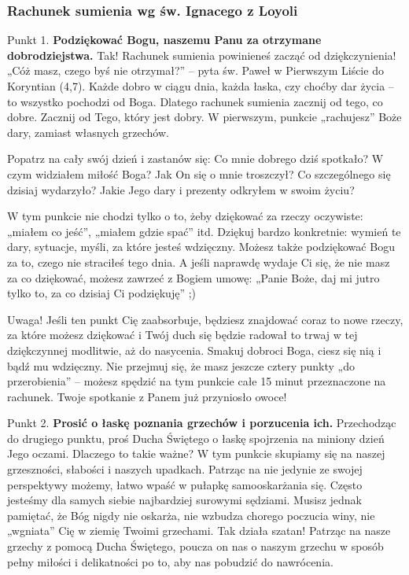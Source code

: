 \documentclass[twocolumn,fleqn,oneside,openany,a5paper,12pt]{book}
\def\mysec#1{\subsubsection*{#1}\addcontentsline{toc}{chapter}{#1}}
\begin{document}
\mysec{Rachunek sumienia wg św. Ignacego z Loyoli}
Punkt 1.
\textbf{Podziękować Bogu, naszemu Panu za otrzymane dobrodziejstwa.}
Tak! Rachunek sumienia powinieneś zacząć od dziękczynienia! „Cóż masz, czego byś nie otrzymał?” – pyta św. Paweł w Pierwszym Liście do Koryntian (4,7). Każde dobro w ciągu dnia, każda łaska, czy choćby dar życia – to wszystko pochodzi od Boga. Dlatego rachunek sumienia zacznij od tego, co dobre. Zacznij od Tego, który jest dobry. W pierwszym, punkcie „rachujesz” Boże dary, zamiast własnych grzechów.

Popatrz na cały swój dzień i zastanów się: Co mnie dobrego dziś spotkało? W czym widziałem miłość Boga? Jak On się o mnie troszczył? Co szczególnego się dzisiaj wydarzyło? Jakie Jego dary i prezenty odkryłem w swoim życiu? 

W tym punkcie nie chodzi tylko o to, żeby dziękować za rzeczy oczywiste: „miałem co jeść”, „miałem gdzie spać” itd. Dziękuj bardzo konkretnie: wymień te dary, sytuacje, myśli, za które jesteś wdzięczny. Możesz także podziękować Bogu za to, czego nie straciłeś tego dnia. A jeśli naprawdę wydaje Ci się, że nie masz za co dziękować, możesz zawrzeć z Bogiem umowę: „Panie Boże, daj mi jutro tylko to, za co dzisiaj Ci podziękuję” ;)

Uwaga! Jeśli ten punkt Cię zaabsorbuje, będziesz znajdować coraz to nowe rzeczy, za które możesz dziękować i Twój duch się będzie radował to trwaj w tej dziękczynnej modlitwie, aż do nasycenia. Smakuj dobroci Boga, ciesz się nią i bądź mu wdzięczny. Nie przejmuj się, że masz jeszcze cztery punkty „do przerobienia” – możesz spędzić na tym punkcie całe 15 minut przeznaczone na rachunek. Twoje spotkanie z Panem już przyniosło owoce!

 

Punkt 2.
\textbf{Prosić o łaskę poznania grzechów i porzucenia ich.}
Przechodząc do drugiego punktu, proś Ducha Świętego o łaskę spojrzenia na miniony dzień Jego oczami. Dlaczego to takie ważne? W tym punkcie skupiamy się na naszej grzeszności, słabości i naszych upadkach. Patrząc na nie jedynie ze swojej perspektywy możemy, łatwo wpaść w pułapkę samooskarżania się. Często jesteśmy dla samych siebie najbardziej surowymi sędziami. Musisz jednak pamiętać, że Bóg nigdy nie oskarża, nie wzbudza chorego poczucia winy, nie „wgniata” Cię w ziemię Twoimi grzechami. Tak działa szatan! Patrząc na nasze grzechy z pomocą Ducha Świętego, poucza on nas o naszym grzechu w sposób pełny miłości i delikatności po to, aby nas pobudzić do nawrócenia.
\end{document}
